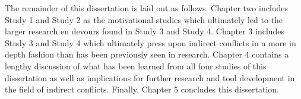 The remainder of this dissertation is laid out as follows. Chapter two includes Study 1 and Study 2 as the motivational studies which
ultimately led to the larger research en devours found in Study 3 and Study 4. Chapter 3 includes Study 3 and Study 4 which ultimately
press upon indirect conflicts in a more in depth fashion than has been previously seen in research. Chapter 4 contains a lengthy discussion
of what has been learned from all four studies of this dissertation as well as implications for further research and tool development
in the field of indirect conflicts. Finally, Chapter 5 concludes this dissertation.